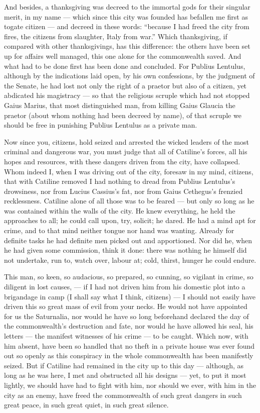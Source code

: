  And besides, a thanksgiving was decreed to the immortal gods for their singular merit, in my name --- which since this city was founded has befallen me first as togate citizen --- and decreed in these words: ``because I had freed the city from fires, the citizens from slaughter, Italy from war.'' Which thanksgiving, if compared with other thanksgivings, has this difference: the others have been set up for affairs well managed, this one alone for the commonwealth saved. And what had to be done first has been done and concluded. For Publius Lentulus, although by the indications laid open, by his own confessions, by the judgment of the Senate, he had lost not only the right of a praetor but also of a citizen, yet abdicated his magistracy --- so that the religious scruple which had not stopped Gaius Marius, that most distinguished man, from killing Gaius Glaucia the praetor (about whom nothing had been decreed by name), of that scruple we should be free in punishing Publius Lentulus as a private man.

 Now since you, citizens, hold seized and arrested the wicked leaders of the most criminal and dangerous war, you must judge that all of Catiline's forces, all his hopes and resources, with these dangers driven from the city, have collapsed. Whom indeed I, when I was driving out of the city, foresaw in my mind, citizens, that with Catiline removed I had nothing to dread from Publius Lentulus's drowsiness, nor from Lucius Cassius's fat, nor from Gaius Cethegus's frenzied recklessness. Catiline alone of all those was to be feared --- but only so long as he was contained within the walls of the city. He knew everything, he held the approaches to all; he could call upon, try, solicit; he dared. He had a mind apt for crime, and to that mind neither tongue nor hand was wanting. Already for definite tasks he had definite men picked out and apportioned. Nor did he, when he had given some commission, think it done: there was nothing he himself did not undertake, run to, watch over, labour at; cold, thirst, hunger he could endure.

 This man, so keen, so audacious, so prepared, so cunning, so vigilant in crime, so diligent in lost causes, --- if I had not driven him from his domestic plot into a brigandage in camp (I shall say what I think, citizens) --- I should not easily have driven this so great mass of evil from your necks. He would not have appointed for us the Saturnalia, nor would he have so long beforehand declared the day of the commonwealth's destruction and fate, nor would he have allowed his seal, his letters --- the manifest witnesses of his crime --- to be caught. Which now, with him absent, have been so handled that no theft in a private house was ever found out so openly as this conspiracy in the whole commonwealth has been manifestly seized. But if Catiline had remained in the city up to this day --- although, as long as he was here, I met and obstructed all his designs --- yet, to put it most lightly, we should have had to fight with him, nor should we ever, with him in the city as an enemy, have freed the commonwealth of such great dangers in such great peace, in such great quiet, in such great silence.

